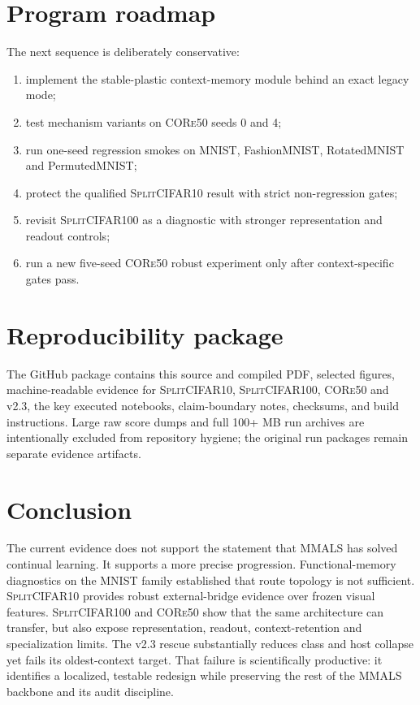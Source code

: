 \documentclass[10pt]{article}
\newcommand{\mmals}{\textsc{MMALS}}
\newcommand{\core}{\textsc{CORe50}}
\newcommand{\scx}{\textsc{SplitCIFAR10}}
\newcommand{\scxx}{\textsc{SplitCIFAR100}}
\begin{document}
\section{Program roadmap}
The next sequence is deliberately conservative:
\begin{enumerate}[leftmargin=*]
\item implement the stable-plastic context-memory module behind an exact legacy mode;
\item test mechanism variants on \core{} seeds 0 and 4;
\item run one-seed regression smokes on MNIST, FashionMNIST, RotatedMNIST and PermutedMNIST;
\item protect the qualified \scx{} result with strict non-regression gates;
\item revisit \scxx{} as a diagnostic with stronger representation and readout controls;
\item run a new five-seed \core{} robust experiment only after context-specific gates pass.
\end{enumerate}

\section{Reproducibility package}
The GitHub package contains this source and compiled PDF, selected figures, machine-readable evidence for \scx{}, \scxx{}, \core{} and v2.3, the key executed notebooks, claim-boundary notes, checksums, and build instructions. Large raw score dumps and full 100+ MB run archives are intentionally excluded from repository hygiene; the original run packages remain separate evidence artifacts.

\section{Conclusion}
The current evidence does not support the statement that \mmals{} has solved continual learning. It supports a more precise progression. Functional-memory diagnostics on the MNIST family established that route topology is not sufficient. \scx{} provides robust external-bridge evidence over frozen visual features. \scxx{} and \core{} show that the same architecture can transfer, but also expose representation, readout, context-retention and specialization limits. The v2.3 rescue substantially reduces class and host collapse yet fails its oldest-context target. That failure is scientifically productive: it identifies a localized, testable redesign while preserving the rest of the \mmals{} backbone and its audit discipline.
\end{document}
